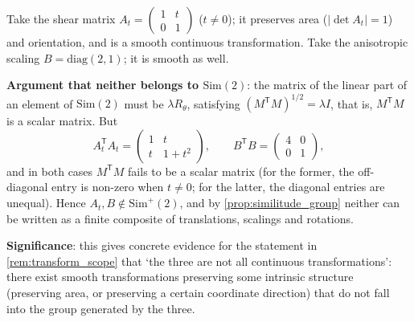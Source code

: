 \begin{example}\label{ex:shear_anisotropic}
Take the shear matrix $A_t = \left(\begin{smallmatrix}1 & t\\ 0 & 1\end{smallmatrix}\right)$ ($t\ne0$); it preserves area ($|\det A_t|=1$) and orientation, and is a smooth continuous transformation. Take the anisotropic scaling $B=\mathrm{diag}(2,1)$; it is smooth as well.

\textbf{Argument that neither belongs to $\mathrm{Sim}(2)$}: the matrix of the linear part of an element of $\mathrm{Sim}(2)$ must be $\lambda R_\theta$, satisfying $(M^{\mathsf T}M)^{1/2}=\lambda I$, that is, $M^{\mathsf T}M$ is a scalar matrix. But
\[
A_t^{\mathsf T}A_t=\begin{pmatrix}1&t\\ t&1+t^2\end{pmatrix},\qquad
B^{\mathsf T}B=\begin{pmatrix}4&0\\0&1\end{pmatrix},
\]
and in both cases $M^{\mathsf T}M$ fails to be a scalar matrix (for the former, the off-diagonal entry is non-zero when $t\ne0$; for the latter, the diagonal entries are unequal). Hence $A_t,B\notin\mathrm{Sim}^{+}(2)$, and by \cref{prop:similitude_group} neither can be written as a finite composite of translations, scalings and rotations.

\textbf{Significance}: this gives concrete evidence for the statement in \cref{rem:transform_scope} that `the three are not all continuous transformations': there exist smooth transformations preserving some intrinsic structure (preserving area, or preserving a certain coordinate direction) that do not fall into the group generated by the three.
\end{example}


